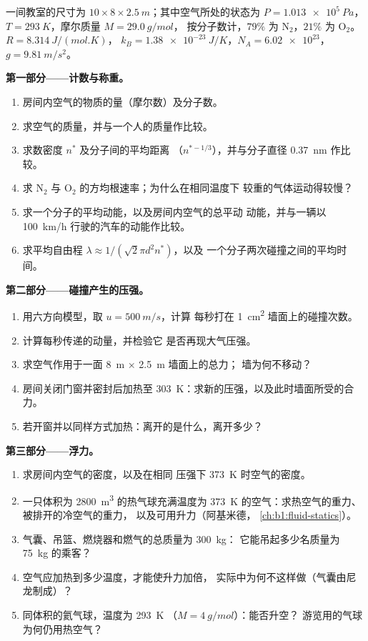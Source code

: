\begin{problem}
\label{pb:b1:kinetic-theory:1}
一间教室的尺寸为 $10 \times 8 \times \qty{2.5}{m}$；其中空气所处的状态为
$P = \qty{1.013e5}{Pa}$，$T = \qty{293}{K}$，摩尔质量 $M = \qty{29.0}{g/mol}$，
按分子数计，$79\%$ 为 N$_2$，$21\%$ 为 O$_2$。$R = \qty{8.314}{J/(mol.K)}$，
$k_B = \qty{1.38e-23}{J/K}$，$N_A = \num{6.02e23}$，$g = \qty{9.81}{m/s^2}$。

\medskip
\noindent\textbf{第一部分——计数与称重。}
\begin{enumerate}
  \item 房间内空气的物质的量（摩尔数）及分子数。
  \item 求空气的质量，并与一个人的质量作比较。
  \item 求数密度 $n^*$ 及分子间的平均距离
        （$n^{*-1/3}$），并与分子直径 \qty{0.37}{nm} 作比较。
  \item 求 N$_2$ 与 O$_2$ 的方均根速率；为什么在相同温度下
        较重的气体运动得较慢？
  \item 求一个分子的平均动能，以及房间内空气的总平动
        动能，并与一辆以
        \qty{100}{km/h} 行驶的汽车的动能作比较。
  \item 求平均自由程 $\lambda \approx 1/(\sqrt2\pi d^2n^*)$，以及
        一个分子两次碰撞之间的平均时间。
\end{enumerate}

\medskip
\noindent\textbf{第二部分——碰撞产生的压强。}
\begin{enumerate}[resume]
  \item 用六方向模型，取 $u = \qty{500}{m/s}$，计算
        每秒打在 \qty{1}{cm^2} 墙面上的碰撞次数。
  \item 计算每秒传递的动量，并检验它
        是否再现大气压强。
  \item 求空气作用于一面 \qty{8}{m} × \qty{2.5}{m} 墙面上的总力；
        墙为何不移动？
  \item 房间关闭门窗并密封后加热至
        \qty{303}{K}：求新的压强，以及此时墙面所受的合力。
  \item 若开窗并以同样方式加热：离开的是什么，离开多少？
\end{enumerate}

\medskip
\noindent\textbf{第三部分——浮力。}
\begin{enumerate}[resume]
  \item 求房间内空气的密度，以及在相同
        压强下 \qty{373}{K} 时空气的密度。
  \item 一只体积为 \qty{2800}{m^3} 的热气球充满温度为
        \qty{373}{K} 的空气：求热空气的重力、被排开的冷空气的重力，
        以及可用升力（阿基米德，
        \cref{ch:b1:fluid-statics}）。
  \item 气囊、吊篮、燃烧器和燃气的总质量为 \qty{300}{kg}：
        它能吊起多少名质量为 \qty{75}{kg} 的乘客？
  \item 空气应加热到多少温度，才能使升力加倍，
        实际中为何不这样做（气囊由尼龙制成）？
  \item 同体积的氦气球，温度为 \qty{293}{K}
        （$M = \qty{4}{g/mol}$）：能否升空？
        游览用的气球为何仍用热空气？
\end{enumerate}


\end{problem}
